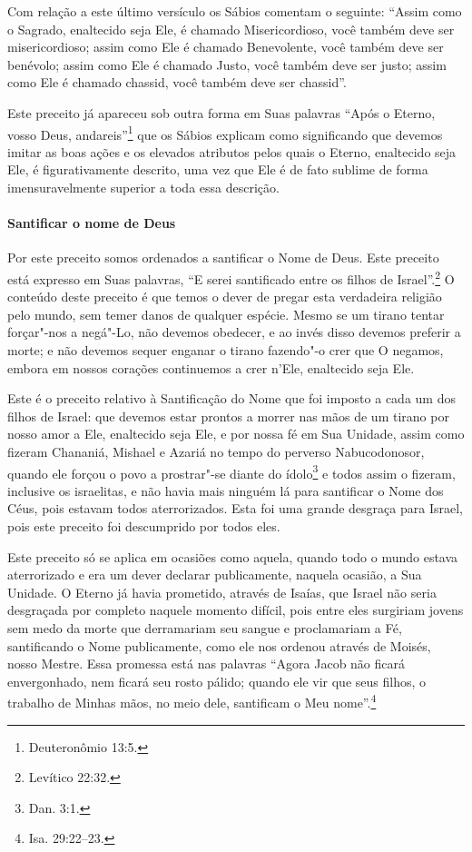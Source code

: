 \begin{multicols}{2}
Com relação a este último versículo os Sábios comentam o seguinte:
``Assim como o Sagrado, enaltecido seja Ele, é chamado Misericordioso,
você também deve ser misericordioso; assim como Ele é chamado
Benevolente, você também deve ser benévolo; assim como Ele é chamado
Justo, você também deve ser justo; assim como Ele é chamado chassid\starr,
você também deve ser chassid\starr''.

Este preceito já apareceu sob outra forma em Suas palavras ``Após o
Eterno, vosso Deus, andareis''\footnote{Deuteronômio 13:5.} que os Sábios
explicam como significando que devemos imitar as boas ações e os
elevados atributos pelos quais o Eterno, enaltecido seja Ele, é
figurativamente descrito, uma vez que Ele é de fato sublime de forma
imensuravelmente superior a toda essa descrição.



\paragraph{Santificar o nome de Deus}

Por este preceito somos ordenados a santificar o Nome de Deus. Este
preceito está expresso em Suas palavras, ``E serei santificado entre os
filhos de Israel''.\footnote{Levítico 22:32.} O conteúdo deste preceito é que
temos o dever de pregar esta verdadeira religião pelo mundo, sem temer
danos de qualquer espécie. Mesmo se um tirano tentar forçar"-nos a
negá"-Lo, não devemos obedecer, e ao invés disso devemos preferir a
morte; e não devemos sequer enganar o tirano fazendo"-o crer que O
negamos, embora em nossos corações continuemos a crer n'Ele, enaltecido
seja Ele.

Este é o preceito relativo à Santificação do Nome que foi imposto a cada
um dos filhos de Israel: que devemos estar prontos a morrer nas mãos de
um tirano por nosso amor a Ele, enaltecido seja Ele, e por nossa fé em
Sua Unidade, assim como fizeram Chananiá\starr, Mishael\starr{} e Azariá\starr{} no tempo do perverso
Nabucodonosor, quando ele forçou o povo a prostrar"-se diante do
ídolo\footnote{Dan. 3:1.} e todos assim o fizeram, inclusive os
israelitas, e não havia mais ninguém lá para santificar o Nome dos
Céus, pois estavam todos aterrorizados. Esta foi uma grande desgraça
para Israel, pois este preceito foi descumprido por todos eles.

Este preceito só se aplica em ocasiões como aquela, quando todo
o mundo estava aterrorizado e era um dever declarar publicamente,
naquela ocasião, a Sua Unidade. O Eterno já havia prometido, através de
Isaías, que Israel não seria desgraçada por completo naquele momento
difícil, pois entre eles surgiriam jovens sem medo da morte que
derramariam seu sangue e proclamariam a Fé, santificando o Nome
publicamente, como ele nos ordenou através
de Moisés, nosso Mestre. Essa promessa está nas palavras ``Agora Jacob\starr{}
não ficará envergonhado, nem ficará seu rosto pálido; quando ele vir que seus
filhos, o
trabalho de Minhas mãos, no meio dele, santificam o Meu
nome''.\footnote{Isa. 29:22--23.}


\end{multicols}
